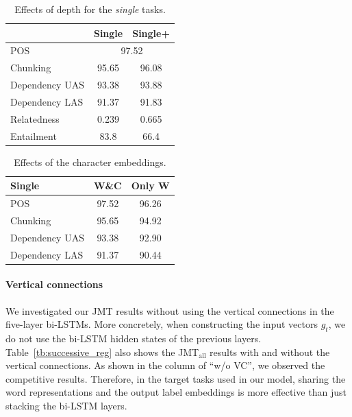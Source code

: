 \documentclass[11pt,a4paper]{article}
\begin{document}
\begin{table}[t]
{\scriptsize
	\begin{center}
	\begin{tabular}{l|cc}
  			   & Single & Single+ \\ \hline
    POS        & \multicolumn{2}{|c}{97.52} \\ \hline
    Chunking   & 95.65 & 96.08 \\ \hline
    Dependency UAS & 93.38 & 93.88 \\
    Dependency LAS & 91.37 & 91.83 \\ \hline
    Relatedness    & 0.239 & 0.665 \\ \hline
    Entailment     & 83.8  & 66.4 \\ \hline
  \end{tabular}
  \end{center}
}
    \caption{Effects of depth for the {\it single} tasks.}
    \label{tb:single_plus}
\end{table}

\begin{table}[t]
{\scriptsize
	\begin{center}
	\begin{tabular}{l|c|c}
 	Single 	   & W\&C & Only W \\ \hline
    POS        & 97.52 & 96.26 \\ \hline
    Chunking   & 95.65 & 94.92 \\ \hline
    Dependency UAS & 93.38 & 92.90 \\
    Dependency LAS & 91.37 & 90.44 \\ \hline
  \end{tabular}
  \end{center}
}
    \caption{Effects of the character embeddings.}
    \label{tb:char_comp}
\end{table}


\paragraph{Vertical connections}
We investigated our JMT results without using the vertical connections in the five-layer bi-LSTMs.
More concretely, when constructing the input vectors $g_t$, we do not use the bi-LSTM hidden states of the previous layers.
Table~\ref{tb:successive_reg} also shows the JMT$_{\mathrm{all}}$ results with and without the vertical connections.
As shown in the column of ``w/o VC'', we observed the competitive results.
Therefore, in the target tasks used in our model, sharing the word representations and the output label embeddings is more effective than just stacking the bi-LSTM layers.
\end{document}

